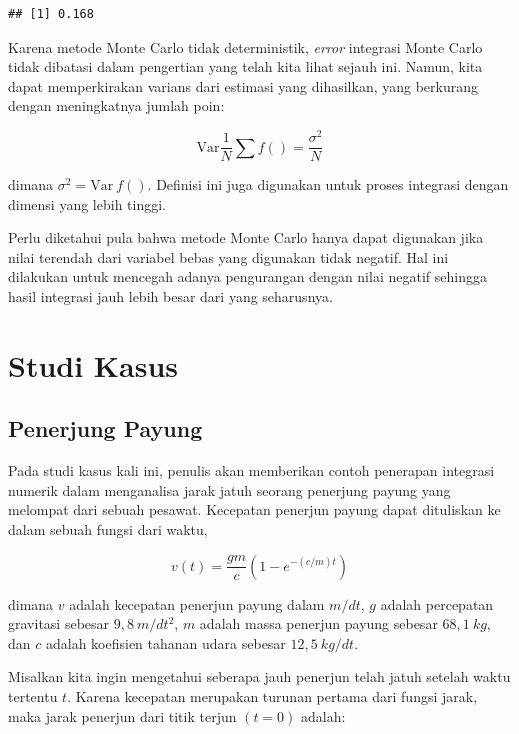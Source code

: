 \documentclass[
]{book}
\theoremstyle{definition}
\theoremstyle{definition}
\theoremstyle{definition}
\theoremstyle{definition}
\theoremstyle{remark}
\begin{document}
\begin{verbatim}
## [1] 0.168
\end{verbatim}

Karena metode Monte Carlo tidak deterministik, \emph{error} integrasi Monte Carlo tidak dibatasi dalam pengertian yang telah kita lihat sejauh ini. Namun, kita dapat memperkirakan varians dari estimasi yang dihasilkan, yang berkurang dengan meningkatnya jumlah poin:

\begin{equation}
\text{Var}\frac{1}{N}\sum f\left(\right)=\frac{\sigma^2}{N}
  \label{eq:monte3}
\end{equation}

dimana \(\sigma^2=\text{Var}\ f\left(\right)\). Definisi ini juga digunakan untuk proses integrasi dengan dimensi yang lebih tinggi.

Perlu diketahui pula bahwa metode Monte Carlo hanya dapat digunakan jika nilai terendah dari variabel bebas yang digunakan tidak negatif. Hal ini dilakukan untuk mencegah adanya pengurangan dengan nilai negatif sehingga hasil integrasi jauh lebih besar dari yang seharusnya.

\hypertarget{studi-kasus-2}{%
\section{Studi Kasus}\label{studi-kasus-2}}

\hypertarget{penerjung-payung}{%
\subsection{Penerjung Payung}\label{penerjung-payung}}

Pada studi kasus kali ini, penulis akan memberikan contoh penerapan integrasi numerik dalam menganalisa jarak jatuh seorang penerjung payung yang melompat dari sebuah pesawat. Kecepatan penerjun payung dapat dituliskan ke dalam sebuah fungsi dari waktu,

\begin{equation}
v\left(t\right)=\frac{gm}{c}\left(1-e^{-\left(c/m\right)t}\right)
  \label{eq:terjun}
\end{equation}

dimana \(v\) adalah kecepatan penerjun payung dalam \(m/dt\), \(g\) adalah percepatan gravitasi sebesar \(9,8 \ m/dt^2\), \(m\) adalah massa penerjun payung sebesar \(68,1 \ kg\), dan \(c\) adalah koefisien tahanan udara sebesar \(12,5\ kg/dt\).

Misalkan kita ingin mengetahui seberapa jauh penerjun telah jatuh setelah waktu tertentu \(t\). Karena kecepatan merupakan turunan pertama dari fungsi jarak, maka jarak penerjun dari titik terjun \(\left(t=0\right)\) adalah:
\end{document}
